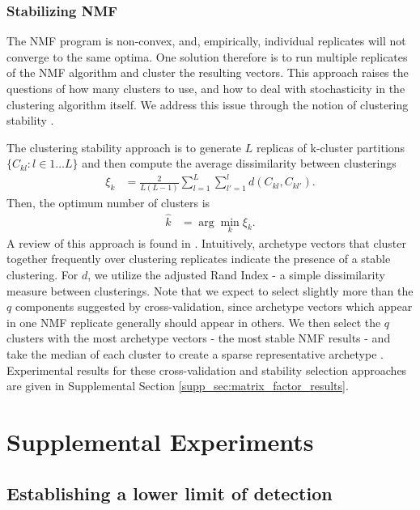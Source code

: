 \subsubsection{Stabilizing NMF}

The NMF program is non-convex, and, empirically, individual replicates will not converge to the same optima.
One solution therefore is to run multiple replicates of the NMF algorithm and cluster the resulting vectors.
This approach raises the questions of how many clusters to use, and how to deal with stochasticity in the clustering algorithm itself.
We address this issue through the notion of clustering stability \citep{Von_Luxburg2010-lu}.

The clustering stability approach is to generate $L$ replicas of k-cluster partitions $\{C_{kl} : l \in 1 \dots L\}$ and then compute the average dissimilarity between clusterings
\begin{align*}
\xi_k &= \frac{2}{L(L - 1)} \sum_{l = 1}^{L} \sum_{l'= 1}^{l}  d(C_{kl}, C_{kl'}).
\end{align*}
Then, the optimum number of clusters is 
\begin{align*}
\hat k &= \arg \min_k \xi_k.
\end{align*}
A review of this approach is found in \citet{Von_Luxburg2010-qe}.
Intuitively, archetype vectors that cluster together frequently over clustering replicates indicate the presence of a stable clustering.
For $d$, we utilize the adjusted Rand Index - a simple dissimilarity measure between clusterings.
Note that we expect to select slightly more than the $q$ components suggested by cross-validation, since archetype vectors which appear in one NMF replicate generally should appear in others.
We then select the $q$ clusters with the most archetype vectors - the most stable NMF results - and take the median of each cluster to create a sparse representative archetype \citet{Wu2016-gg, Kotliar2019-yj}.
Experimental results for these cross-validation and stability selection approaches are given in Supplemental Section \ref{supp_sec:matrix_factor_results}.

\newpage

\section{Supplemental Experiments}
\label{supp_sec:exp}

\subsection{Establishing a lower limit of detection}
\label{supp:exp_lower}

